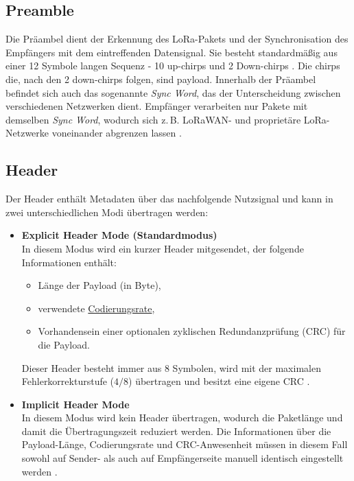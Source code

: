 \subsection{Preamble}
	Die Präambel dient der Erkennung des LoRa-Pakets und der Synchronisation des Empfängers mit dem eintreffenden Datensignal. 
	Sie besteht standardmä{\ss}ig aus einer 12 Symbole langen Sequenz - 10 up-chirps und 2 Down-chirps \cite{Semtech:2024, Gao:2023}.  Die chirps die, nach den 2 down-chirps folgen, sind payload.
	Innerhalb der Präambel befindet sich auch das sogenannte \emph{Sync Word}, das der Unterscheidung zwischen verschiedenen Netzwerken dient.  
	Empfänger verarbeiten nur Pakete mit demselben \emph{Sync Word}, wodurch sich z.\,B. LoRaWAN- und proprietäre LoRa-Netzwerke voneinander abgrenzen lassen \cite{Savaux:2021}.
	
\subsection{Header}
	Der Header enthält Metadaten über das nachfolgende Nutzsignal und kann in zwei unterschiedlichen Modi übertragen werden:
	
	\begin{itemize}
		\item \textbf{Explicit Header Mode (Standardmodus)}\\
		In diesem Modus wird ein kurzer Header mitgesendet, der folgende Informationen enthält:
		\begin{itemize}
			\item Länge der Payload (in Byte),
			\item verwendete \hyperref[lora:codingRate]{Codierungsrate},
			\item Vorhandensein einer optionalen zyklischen Redundanzprüfung (CRC) für die Payload.
		\end{itemize}
		Dieser Header besteht immer aus 8 Symbolen, wird mit der maximalen Fehlerkorrekturstufe (\(4/8\)) übertragen und besitzt eine eigene CRC \cite{Semtech:2024}.
		
		\item \textbf{Implicit Header Mode}\\
		In diesem Modus wird kein Header übertragen, wodurch die Paketlänge und damit die Übertragungszeit reduziert werden. Die Informationen über die Payload-Länge, Codierungsrate und CRC-Anwesenheit müssen in diesem Fall sowohl auf Sender- als auch auf Empfängerseite manuell identisch eingestellt werden \cite{Semtech:2024}.
	\end{itemize}
	
